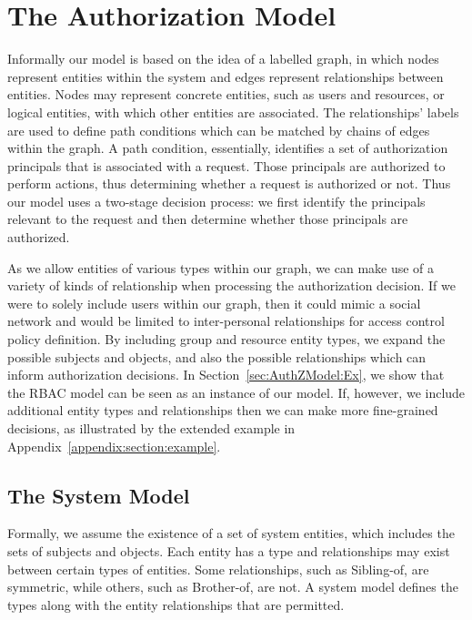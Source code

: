 \documentclass{article}
\begin{document}
\section{The Authorization Model}\label{sec:AuthZModel}


Informally our model is based on the idea of a labelled graph, in which nodes represent entities within the system and edges represent relationships between entities.
Nodes may represent concrete entities, such as users and resources, or logical entities, with which other entities are associated.
The relationships' labels are used to define path conditions which can be matched by chains of edges within the graph.
A path condition, essentially, identifies a set of authorization principals that is associated with a request.
Those principals are authorized to perform actions, thus determining whether a request is authorized or not.
Thus our model uses a two-stage decision process: we first identify the principals relevant to the request and then determine whether those principals are authorized.

As we allow entities of various types within our graph, we can make use of a variety of kinds of relationship when processing the authorization decision.
If we were to solely include users within our graph, then it could mimic a social network and would be limited to inter-personal relationships for access control policy definition.
By including group and resource entity types, we expand the possible subjects and objects, and also the possible relationships which can inform authorization decisions.
In Section~\ref{sec:AuthZModel:Ex}, we show that the RBAC model can be seen as an instance of our model.
If, however, we include additional entity types and relationships then we can make more fine-grained decisions, as illustrated by the extended example in Appendix~\ref{appendix:section:example}.

\subsection{The System Model}

Formally, we assume the existence of a set of system entities, which includes the sets of subjects and objects.
Each entity has a type and relationships may exist between certain types of entities.
Some relationships, such as \textsf{Sibling-of}, are symmetric, while others, such as \textsf{Brother-of}, are not.
A system model defines the types along with the entity relationships that are permitted.
\end{document}
